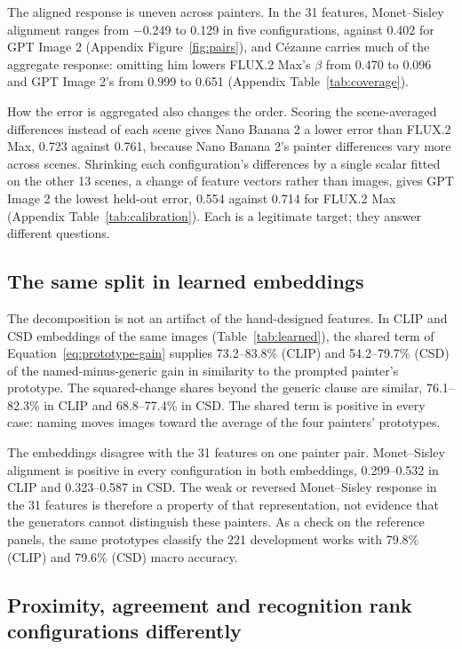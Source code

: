 \documentclass[10pt]{article}
\begin{document}
The aligned response is uneven across painters. In the 31 features, Monet--Sisley
alignment ranges from $-$0.249 to 0.129 in five configurations, against 0.402 for
GPT Image 2 (Appendix Figure~\ref{fig:pairs}), and C\'ezanne carries much of the
aggregate response: omitting him lowers FLUX.2 Max's $\beta$ from 0.470 to 0.096 and
GPT Image 2's from 0.999 to 0.651 (Appendix Table~\ref{tab:coverage}).

How the error is aggregated also changes the order. Scoring the scene-averaged
differences instead of each scene gives Nano Banana 2 a lower error than FLUX.2 Max,
0.723 against 0.761, because Nano Banana 2's painter differences vary more across
scenes. Shrinking each configuration's differences by a single scalar fitted on the
other 13 scenes, a change of feature vectors rather than images, gives GPT Image 2
the lowest held-out error, 0.554 against 0.714 for FLUX.2 Max
(Appendix Table~\ref{tab:calibration}). Each is a legitimate target; they answer
different questions.

\subsection{The same split in learned embeddings}\label{sec:learned}



The decomposition is not an artifact of the hand-designed features.
In CLIP and CSD embeddings of the same images
(Table~\ref{tab:learned}), the shared term of Equation~\ref{eq:prototype-gain}
supplies 73.2--83.8\% (CLIP) and 54.2--79.7\% (CSD) of the named-minus-generic
gain in similarity to the prompted painter's prototype. The squared-change shares
beyond the generic clause are similar, 76.1--82.3\% in CLIP and 68.8--77.4\% in CSD.
The shared term is positive in every case: naming moves images toward the average
of the four painters' prototypes.

The embeddings disagree with the 31 features on one painter pair. Monet--Sisley
alignment is positive in every configuration in both embeddings, 0.299--0.532 in
CLIP and 0.323--0.587 in CSD. The weak or reversed Monet--Sisley response in the 31
features is therefore a property of that representation, not evidence that the
generators cannot distinguish these painters. As a check on the reference panels,
the same prototypes classify the 221 development works with 79.8\% (CLIP) and
79.6\% (CSD) macro accuracy.

\subsection{Proximity, agreement and recognition rank configurations differently}\label{sec:readouts}
\end{document}
